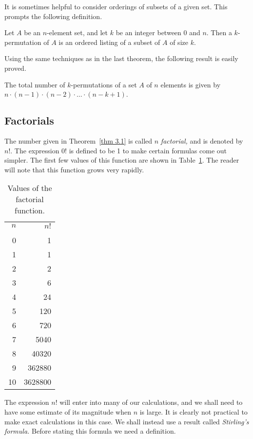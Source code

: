 It is sometimes helpful to consider orderings of subsets of a given set.  This prompts
the following definition. 
\begin{definition} Let $A$ be an $n$-element set, and let $k$ be an integer between 0
and $n$.  Then a $k$-permutation of $A$ is an ordered listing of a subset of $A$ of
size $k$.
\end{definition}

Using the same techniques as in the last theorem, the following result is easily
proved. 

\begin{theorem}\label{thm 3.2} The total number of $k$-permutations of a set $A$ of
$n$ elements is given by $n \cdot (n-1) \cdot (n-2) \cdot \ldots \cdot (n - k + 1)$.
\end{theorem}

\subsection*{Factorials}

The number given in Theorem~\ref{thm 3.1} is called $n$ {\em factorial,} 
and is denoted by $n!$.  The expression 0! is defined to be 1 to make certain
formulas come out simpler.  The first few values of this function are shown in
Table~\ref{table 3.25}.  The reader will note that this function grows very
rapidly.

\begin{table}
\centering
\begin{tabular}{rr} $n$     & $n!$ \\
\\ 
0 & 1 \\
1 & 1 \\
2 & 2 \\
3 & 6 \\
4 & 24 \\
5 & 120 \\
6 & 720 \\
7 & 5040 \\
8 & 40320 \\
9 & 362880 \\
10 & 3628800 \\

\end{tabular}
\caption{Values of the factorial function.}
\label{table 3.25}
\end{table}




\par The expression $n!$ will enter into many of our calculations, and we shall need to
have some estimate of its magnitude when $n$ is large.  It is clearly not practical to
make exact calculations in this case.  We shall instead use a result called {\em
Stirling's formula.}  Before stating this formula we need a definition.

